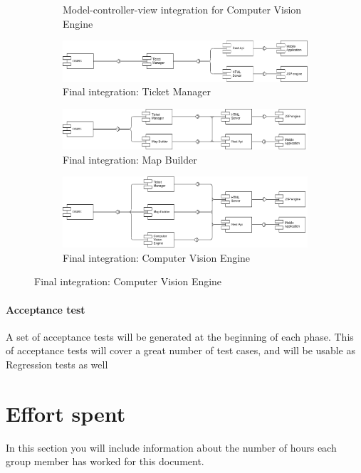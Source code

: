 \documentclass{article}
\begin{document}
\begin{figure}[h]
\begin{subfigure}[H]{\linewidth}
			\caption{Model-controller-view integration for Computer Vision Engine}
		\end{subfigure}
		\begin{subfigure}[H]{\linewidth}
			\includegraphics[width=\linewidth]{images/Integration_basicLogic_4.png}
			\caption{Final integration: Ticket Manager}
		\end{subfigure}
		\begin{subfigure}[H]{\linewidth}
			\includegraphics[width=\linewidth]{images/Integration_basicLogic_8.png}
			\caption{Final integration: Map Builder}
		\end{subfigure}
		\begin{subfigure}[H]{\linewidth}
			\includegraphics[width=\linewidth]{images/Integration_basicLogic_12.png}
			\caption{Final integration: Computer Vision Engine}
		\end{subfigure}
	\end{figure}

\paragraph{Acceptance test} A set of acceptance tests will be generated at the beginning of each phase. This of acceptance tests will cover a great number of test cases, and will be usable as Regression tests as well

\section{Effort spent}In	 this	 section	you	will	include	information	about	 the	number	of	hours	each	
group	member	has	worked	for	this	document.
\end{document}
